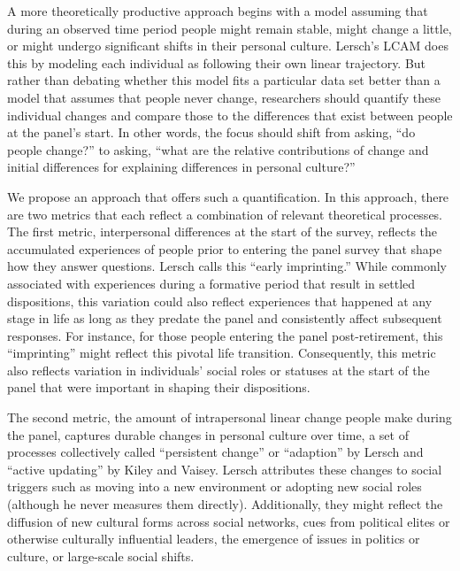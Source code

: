 \documentclass[
  12pt,
]{article}
\begin{document}
A more theoretically productive approach begins with a model assuming
that during an observed time period people might remain stable, might
change a little, or might undergo significant shifts in their personal
culture. Lersch's LCAM does this by modeling each individual as
following their own linear trajectory. But rather than debating whether
this model fits a particular data set better than a model that assumes
that people never change, researchers should quantify these individual
changes and compare those to the differences that exist between people
at the panel's start. In other words, the focus should shift from
asking, ``do people change?'' to asking, ``what are the relative
contributions of change and initial differences for explaining
differences in personal culture?''

We propose an approach that offers such a quantification. In this
approach, there are two metrics that each reflect a combination of
relevant theoretical processes. The first metric, interpersonal
differences at the start of the survey, reflects the accumulated
experiences of people prior to entering the panel survey that shape how
they answer questions. Lersch calls this ``early imprinting.'' While
commonly associated with experiences during a formative period that
result in settled dispositions, this variation could also reflect
experiences that happened at any stage in life as long as they predate
the panel and consistently affect subsequent responses. For instance,
for those people entering the panel post-retirement, this ``imprinting''
might reflect this pivotal life transition. Consequently, this metric
also reflects variation in individuals' social roles or statuses at the
start of the panel that were important in shaping their dispositions.

The second metric, the amount of intrapersonal linear change people make
during the panel, captures durable changes in personal culture over
time, a set of processes collectively called ``persistent change'' or
``adaption'' by Lersch and ``active updating'' by Kiley and Vaisey.
Lersch attributes these changes to social triggers such as moving into a
new environment or adopting new social roles (although he never measures
them directly). Additionally, they might reflect the diffusion of new
cultural forms across social networks, cues from political elites or
otherwise culturally influential leaders, the emergence of issues in
politics or culture, or large-scale social shifts.
\end{document}
